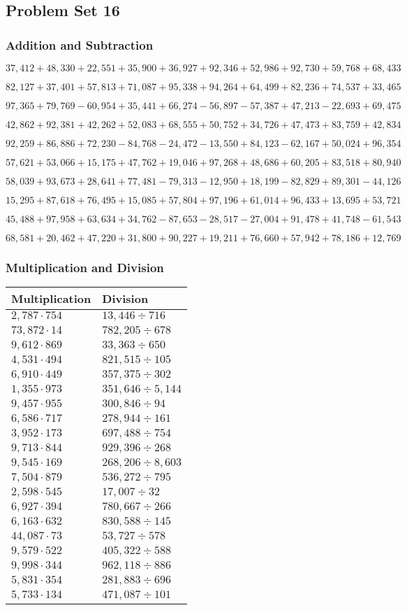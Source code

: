 \hypertarget{problem-set-16-4}{%
\subsection{Problem Set 16}\label{problem-set-16-4}}

\hypertarget{addition-and-subtraction-238}{%
\subsubsection{Addition and
Subtraction}\label{addition-and-subtraction-238}}

\(37,412+48,330+22,551+35,900+36,927+92,346+52,986+92,730+59,768+ 68,433\)

\(82,127+37,401+57,813+71,087+95,338+94,264+64,499+82,236+74,537+33,465\)

\(97,365+79,769-60,954+35,441+66,274-56,897-57,387+47,213-22,693+69,475\)

\(42,862+92,381+42,262+52,083+68,555+50,752+34,726+47,473+83,759+42,834\)

\(92,259+86,886+72,230-84,768-24,472-13,550+84,123-62,167+50,024+96,354\)

\(57,621+53,066+15,175+47,762+19,046+97,268+48,686+60,205+83,518+80,940\)

\(58,039+93,673+28,641+77,481-79,313-12,950+18,199-82,829+89,301-44,126\)

\(15,295+87,618+76,495+15,085+57,804+97,196+61,014+96,433+13,695+53,721\)

\(45,488+97,958+63,634+34,762-87,653-28,517-27,004+91,478+41,748-61,543\)

\(68,581+20,462+47,220+31,800+90,227+19,211+76,660+57,942+78,186+12,769\)

\hypertarget{multiplication-and-division-237}{%
\subsubsection{Multiplication and
Division}\label{multiplication-and-division-237}}

\begin{longtable}[]{@{}ll@{}}
\toprule
Multiplication & Division\tabularnewline
\midrule
\endhead
\(2,787\cdot754\) & \(13,446 ÷716\)\tabularnewline
\(73,872\cdot14\) & \(782,205÷678\)\tabularnewline
\(9,612\cdot869\) & \(33,363÷650\)\tabularnewline
\(4,531\cdot494\) & \(821,515÷105\)\tabularnewline
\(6,910\cdot449\) & \(357,375÷302\)\tabularnewline
\(1,355\cdot973\) & \(351,646÷5,144\)\tabularnewline
\(9,457\cdot955\) & \(300,846÷94\)\tabularnewline
\(6,586\cdot717\) & \(278,944÷161\)\tabularnewline
\(3,952\cdot173\) & \(697,488÷754\)\tabularnewline
\(9,713\cdot844\) & \(929,396÷268\)\tabularnewline
\(9,545\cdot169\) & \(268,206÷8,603\)\tabularnewline
\(7,504\cdot879\) & \(536,272÷795\)\tabularnewline
\(2,598\cdot545\) & \(17,007÷32\)\tabularnewline
\(6,927\cdot394\) & \(780,667÷266\)\tabularnewline
\(6,163\cdot632\) & \(830,588÷145\)\tabularnewline
\(44,087\cdot73\) & \(53,727÷578\)\tabularnewline
\(9,579\cdot522\) & \(405,322÷588\)\tabularnewline
\(9,998\cdot344\) & \(962,118÷886\)\tabularnewline
\(5,831\cdot354\) & \(281,883÷696\)\tabularnewline
\(5,733\cdot134\) & \(471,087÷101\)\tabularnewline
\bottomrule
\end{longtable}

